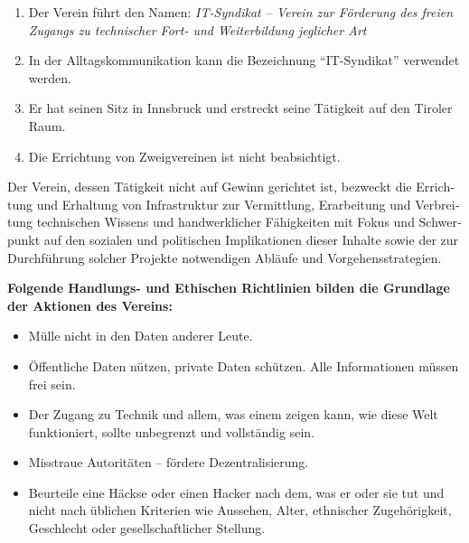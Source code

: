 \begin{otherlanguage}{german}

\selectfont\tiny


\begin{enumerate}[statutenenum]
    \item Der Verein führt den Namen: \textit{IT-Syndikat -- Verein zur Förderung des freien Zugangs zu technischer Fort- und Weiterbildung jeglicher Art}
    \item In der Alltagskommunikation kann die Bezeichnung
      ``IT-Syndikat'' verwendet werden.

    \item Er hat seinen Sitz in Innsbruck und erstreckt seine Tätigkeit auf den Tiroler Raum.

    \item Die Errichtung von Zweigvereinen ist nicht beabsichtigt.
\end{enumerate}


Der Verein, dessen Tätigkeit nicht auf Gewinn gerichtet ist, bezweckt die Errichtung und Erhaltung von Infrastruktur zur Vermittlung, Erarbeitung und Verbreitung technischen Wissens und handwerklicher Fähigkeiten mit Fokus und Schwerpunkt auf den sozialen und politischen Implikationen dieser Inhalte sowie der zur Durchführung solcher Projekte notwendigen Abläufe und Vorgehensstrategien.

\textbf{Folgende Handlungs- und Ethischen Richtlinien bilden die Grundlage der Aktionen des Vereins:}

\begin{itemize}[statutenenum]
    \item Mülle nicht in den Daten anderer Leute.

    \item Öffentliche Daten nützen, private Daten schützen.
        Alle Informationen müssen frei sein.

    \item Der Zugang zu Technik und allem, was einem zeigen kann, wie diese Welt funktioniert, sollte unbegrenzt und vollständig sein.

    \item Misstraue Autoritäten -- fördere Dezentralisierung.

    \item Beurteile eine Häckse oder einen Hacker nach dem, was er oder sie tut und nicht nach üblichen Kriterien wie Aussehen, Alter, ethnischer Zugehörigkeit, Geschlecht oder gesellschaftlicher Stellung.


\end{itemize}
\end{otherlanguage}
